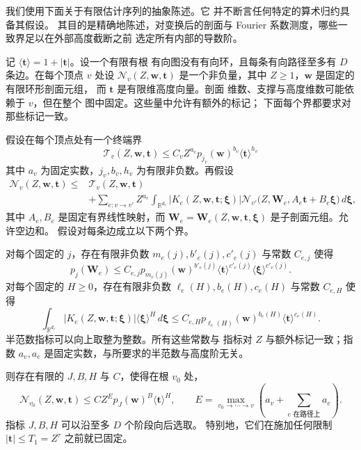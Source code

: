 我们使用下面关于有限估计序列的抽象陈述。它
并不断言任何特定的算术归约具备其假设。
其目的是精确地陈述，对变换后的剖面与
Fourier 系数测度，哪些一致界足以在外部高度截断之前
选定所有内部的导数阶。

记 $\langle\boldsymbol t\rangle=1+|\boldsymbol t|$。设一个有限有根
有向图没有有向环，且每条有向路径至多有
$D$ 条边。在每个顶点 $v$ 处设
$\mathcal N_v(Z,\boldsymbol w,\boldsymbol t)$ 是一个非负量，其中
$Z\ge1$，$\boldsymbol w$ 是固定的有限环形剖面元组，
而 $\boldsymbol t$ 是有限维高度向量。剖面
维数、支撑与高度维数可能依赖于 $v$，但在整个
图中固定。这些量中允许有额外的标记；
下面每个界都要求对那些标记一致。

\begin{lemma}[有限半范数传播]\label{lem:finite-seminorm-propagation}
假设在每个顶点处有一个终端界
\[
 \mathcal T_v(Z,\boldsymbol w,\boldsymbol t)
 \le C_v Z^{a_v}p_{j_v}(\boldsymbol w)^{b_v}
                   \langle\boldsymbol t\rangle^{h_v}
\]
其中 $a_v$ 为固定实数，$j_v,b_v,h_v$ 为有限非负数。再假设
\[
 \begin{split}
 \mathcal N_v(Z,\boldsymbol w,\boldsymbol t)
 \le{}&\mathcal T_v(Z,\boldsymbol w,\boldsymbol t)\\
 &+\sum_{e:v\to v'}Z^{a_e}\int_{\mathbb R^{d_e}}
 |K_e(Z,\boldsymbol w,\boldsymbol t;\boldsymbol\xi)|
 \mathcal N_{v'}\bigl(Z,\boldsymbol W_e,
       A_e\boldsymbol t+B_e\boldsymbol\xi\bigr)\,d\boldsymbol\xi,
 \end{split}
\]
其中 $A_e,B_e$ 是固定有界线性映射，而
$\boldsymbol W_e=\boldsymbol W_e(Z,\boldsymbol w,\boldsymbol t,
\boldsymbol\xi)$ 是子剖面元组。允许空边和。
假设对每条边成立以下两个界。

对每个固定的 $j$，存在有限非负数
$m_e(j),b'_e(j),c'_e(j)$ 与常数 $C_{e,j}$ 使得
\[
 p_j(\boldsymbol W_e)
 \le C_{e,j}p_{m_e(j)}(\boldsymbol w)^{b'_e(j)}
       \langle\boldsymbol t\rangle^{c'_e(j)}
       \langle\boldsymbol\xi\rangle^{c'_e(j)}.
\]
对每个固定的 $H\ge0$，存在有限非负数
$\ell_e(H),b_e(H),c_e(H)$ 与常数 $C_{e,H}$ 使得
\[
 \int_{\mathbb R^{d_e}}|K_e(Z,\boldsymbol w,\boldsymbol t;
            \boldsymbol\xi)|\langle\boldsymbol\xi\rangle^H
                         \,d\boldsymbol\xi
 \le C_{e,H}p_{\ell_e(H)}(\boldsymbol w)^{b_e(H)}
                 \langle\boldsymbol t\rangle^{c_e(H)}.
\]
半范数指标可以向上取整为整数。所有这些常数与
指标对 $Z$ 与额外标记一致；指数 $a_v,a_e$
是固定实数，与所要求的半范数与高度阶无关。

则存在有限的 $J,B,H$ 与 $C$，使得在根 $v_0$ 处，
\[
 \mathcal N_{v_0}(Z,\boldsymbol w,\boldsymbol t)
 \le C Z^E p_J(\boldsymbol w)^B\langle\boldsymbol t\rangle^H,
 \qquad
 E=\max_{v_0\to\cdots\to v}
       \left(a_v+\sum_{e\text{ 在路径上}}a_e\right).
\]
指标 $J,B,H$ 可以沿至多 $D$ 个阶段向后选取。
特别地，它们在施加任何限制
$|\boldsymbol t|\le T_1=Z^\tau$ 之前就已固定。


\end{lemma}
